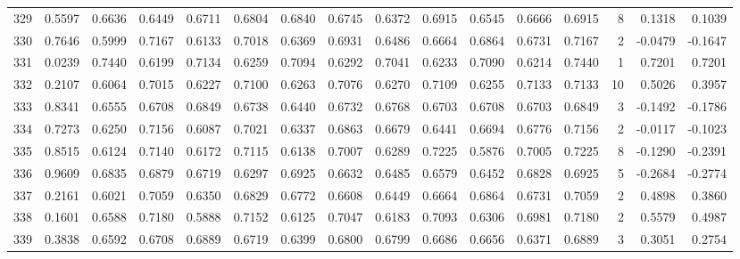 \begin{tabular}{lrrrrrrrrrrrrrrr}
329 &      0.5597 &  0.6636 &  0.6449 &  0.6711 &  0.6804 &  0.6840 &  0.6745 &  0.6372 &  0.6915 &  0.6545 &   0.6666 &     0.6915 &      8 &                    0.1318 &                     0.1039 \\
330 &      0.7646 &  0.5999 &  0.7167 &  0.6133 &  0.7018 &  0.6369 &  0.6931 &  0.6486 &  0.6664 &  0.6864 &   0.6731 &     0.7167 &      2 &                   -0.0479 &                    -0.1647 \\
331 &      0.0239 &  0.7440 &  0.6199 &  0.7134 &  0.6259 &  0.7094 &  0.6292 &  0.7041 &  0.6233 &  0.7090 &   0.6214 &     0.7440 &      1 &                    0.7201 &                     0.7201 \\
332 &      0.2107 &  0.6064 &  0.7015 &  0.6227 &  0.7100 &  0.6263 &  0.7076 &  0.6270 &  0.7109 &  0.6255 &   0.7133 &     0.7133 &     10 &                    0.5026 &                     0.3957 \\
333 &      0.8341 &  0.6555 &  0.6708 &  0.6849 &  0.6738 &  0.6440 &  0.6732 &  0.6768 &  0.6703 &  0.6708 &   0.6703 &     0.6849 &      3 &                   -0.1492 &                    -0.1786 \\
334 &      0.7273 &  0.6250 &  0.7156 &  0.6087 &  0.7021 &  0.6337 &  0.6863 &  0.6679 &  0.6441 &  0.6694 &   0.6776 &     0.7156 &      2 &                   -0.0117 &                    -0.1023 \\
335 &      0.8515 &  0.6124 &  0.7140 &  0.6172 &  0.7115 &  0.6138 &  0.7007 &  0.6289 &  0.7225 &  0.5876 &   0.7005 &     0.7225 &      8 &                   -0.1290 &                    -0.2391 \\
336 &      0.9609 &  0.6835 &  0.6879 &  0.6719 &  0.6297 &  0.6925 &  0.6632 &  0.6485 &  0.6579 &  0.6452 &   0.6828 &     0.6925 &      5 &                   -0.2684 &                    -0.2774 \\
337 &      0.2161 &  0.6021 &  0.7059 &  0.6350 &  0.6829 &  0.6772 &  0.6608 &  0.6449 &  0.6664 &  0.6864 &   0.6731 &     0.7059 &      2 &                    0.4898 &                     0.3860 \\
338 &      0.1601 &  0.6588 &  0.7180 &  0.5888 &  0.7152 &  0.6125 &  0.7047 &  0.6183 &  0.7093 &  0.6306 &   0.6981 &     0.7180 &      2 &                    0.5579 &                     0.4987 \\
339 &      0.3838 &  0.6592 &  0.6708 &  0.6889 &  0.6719 &  0.6399 &  0.6800 &  0.6799 &  0.6686 &  0.6656 &   0.6371 &     0.6889 &      3 &                    0.3051 &                     0.2754 \\

\end{tabular}
